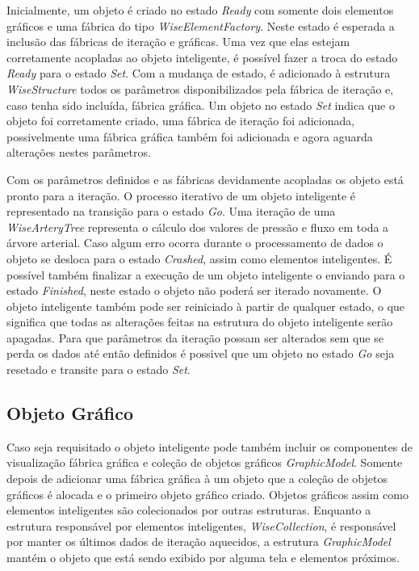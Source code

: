\documentclass[
        english,			
        brazil			        %
        ,<...>]{abntbibufjf}
\begin{document}
Inicialmente, um objeto é criado no estado \textit{Ready} com somente dois elementos gráficos e uma fábrica do tipo \textit{WiseElementFactory}. Neste estado é esperada a inclusão das fábricas de iteração e gráficas. Uma vez que elas estejam corretamente acopladas ao objeto inteligente, é possível fazer a troca do estado \textit{Ready} para o estado \textit{Set}. Com a mudança de estado, é adicionado à estrutura \textit{WiseStructure} todos os parâmetros disponibilizados pela fábrica de iteração e, caso tenha sido incluída, fábrica gráfica. Um objeto no estado \textit{Set} indica que o objeto foi corretamente criado, uma fábrica de iteração foi adicionada, possivelmente uma fábrica gráfica também foi adicionada e agora aguarda alterações nestes parâmetros.

Com os parâmetros definidos e as fábricas devidamente acopladas os objeto está pronto para a iteração. O processo iterativo de um objeto inteligente é representado na transição para o estado \textit{Go}. Uma iteração de uma \textit{WiseArteryTree} representa o cálculo dos valores de pressão e fluxo em toda a árvore arterial. Caso algum erro ocorra durante o processamento de dados o objeto se desloca para o estado \textit{Crashed}, assim como elementos inteligentes. É possível também finalizar a execução de um objeto inteligente o enviando para o estado \textit{Finished}, neste estado o objeto não poderá ser iterado novamente. O objeto inteligente também pode ser reiniciado à partir de qualquer estado, o que significa que todas as alterações feitas na estrutura do objeto inteligente serão apagadas. Para que parâmetros da iteração possam ser alterados sem que se perda os dados até então definidos é possivel que um objeto no estado \textit{Go} seja resetado e transite para o estado \textit{Set}.

\subsection{Objeto Gráfico}\label{sec:objeto_grafico}

Caso seja requisitado o objeto inteligente pode também incluir os componentes de visualização fábrica gráfica e coleção de objetos gráficos \textit{GraphicModel}. Somente depois de adicionar uma fábrica gráfica à um objeto que a coleção de objetos gráficos é alocada e o primeiro objeto gráfico criado. Objetos gráficos assim como elementos inteligentes são colecionados por outras estruturas. Enquanto a estrutura responsável por elementos inteligentes, \textit{WiseCollection}, é responsável por manter os últimos dados de iteração aquecidos, a estrutura \textit{GraphicModel} mantém o objeto que está sendo exibido por alguma tela e elementos próximos.
\end{document}
